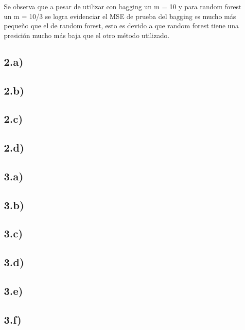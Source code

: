 \documentclass[
]{article}
\begin{document}
Se observa que a pesar de utilizar con bagging un m = 10 y para random
forest un m = 10/3 se logra evidenciar el MSE de prueba del bagging es
mucho más pequeño que el de random forest, esto es devido a que random
forest tiene una presición mucho más baja que el otro método utilizado.

\hypertarget{a-1}{%
\subsection{2.a)}\label{a-1}}

\hypertarget{b-1}{%
\subsection{2.b)}\label{b-1}}

\hypertarget{c-1}{%
\subsection{2.c)}\label{c-1}}

\hypertarget{d-1}{%
\subsection{2.d)}\label{d-1}}

\hypertarget{a-2}{%
\subsection{3.a)}\label{a-2}}

\hypertarget{b-2}{%
\subsection{3.b)}\label{b-2}}

\hypertarget{c-2}{%
\subsection{3.c)}\label{c-2}}

\hypertarget{d-2}{%
\subsection{3.d)}\label{d-2}}

\hypertarget{e-1}{%
\subsection{3.e)}\label{e-1}}

\hypertarget{f}{%
\subsection{3.f)}\label{f}}
\end{document}
